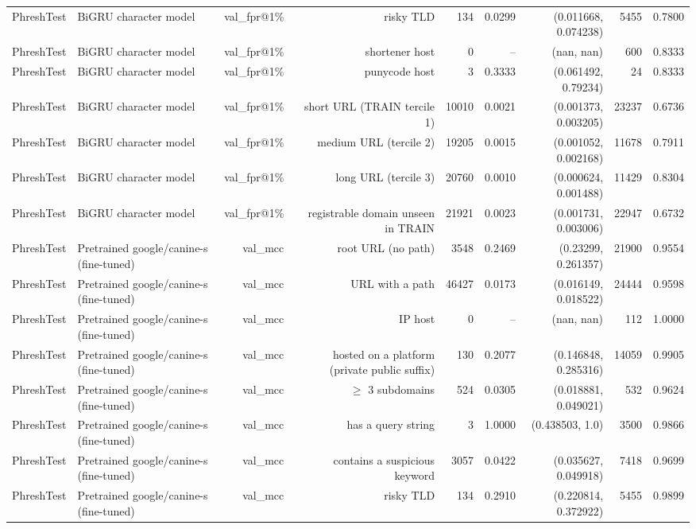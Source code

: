 \begin{table}[t]
\begin{tabular}{llrrrrrrr}
PhreshTest & BiGRU character model & val\_fpr@1\% & risky TLD & 134 & 0.0299 & (0.011668, 0.074238) & 5455 & 0.7800 \\
PhreshTest & BiGRU character model & val\_fpr@1\% & shortener host & 0 & -- & (nan, nan) & 600 & 0.8333 \\
PhreshTest & BiGRU character model & val\_fpr@1\% & punycode host & 3 & 0.3333 & (0.061492, 0.79234) & 24 & 0.8333 \\
PhreshTest & BiGRU character model & val\_fpr@1\% & short URL (TRAIN tercile 1) & 10010 & 0.0021 & (0.001373, 0.003205) & 23237 & 0.6736 \\
PhreshTest & BiGRU character model & val\_fpr@1\% & medium URL (tercile 2) & 19205 & 0.0015 & (0.001052, 0.002168) & 11678 & 0.7911 \\
PhreshTest & BiGRU character model & val\_fpr@1\% & long URL (tercile 3) & 20760 & 0.0010 & (0.000624, 0.001488) & 11429 & 0.8304 \\
PhreshTest & BiGRU character model & val\_fpr@1\% & registrable domain unseen in TRAIN & 21921 & 0.0023 & (0.001731, 0.003006) & 22947 & 0.6732 \\
PhreshTest & Pretrained google/canine-s (fine-tuned) & val\_mcc & root URL (no path) & 3548 & 0.2469 & (0.23299, 0.261357) & 21900 & 0.9554 \\
PhreshTest & Pretrained google/canine-s (fine-tuned) & val\_mcc & URL with a path & 46427 & 0.0173 & (0.016149, 0.018522) & 24444 & 0.9598 \\
PhreshTest & Pretrained google/canine-s (fine-tuned) & val\_mcc & IP host & 0 & -- & (nan, nan) & 112 & 1.0000 \\
PhreshTest & Pretrained google/canine-s (fine-tuned) & val\_mcc & hosted on a platform (private public suffix) & 130 & 0.2077 & (0.146848, 0.285316) & 14059 & 0.9905 \\
PhreshTest & Pretrained google/canine-s (fine-tuned) & val\_mcc & $\geq$ 3 subdomains & 524 & 0.0305 & (0.018881, 0.049021) & 532 & 0.9624 \\
PhreshTest & Pretrained google/canine-s (fine-tuned) & val\_mcc & has a query string & 3 & 1.0000 & (0.438503, 1.0) & 3500 & 0.9866 \\
PhreshTest & Pretrained google/canine-s (fine-tuned) & val\_mcc & contains a suspicious keyword & 3057 & 0.0422 & (0.035627, 0.049918) & 7418 & 0.9699 \\
PhreshTest & Pretrained google/canine-s (fine-tuned) & val\_mcc & risky TLD & 134 & 0.2910 & (0.220814, 0.372922) & 5455 & 0.9899 \\

\end{tabular}
\end{table}
